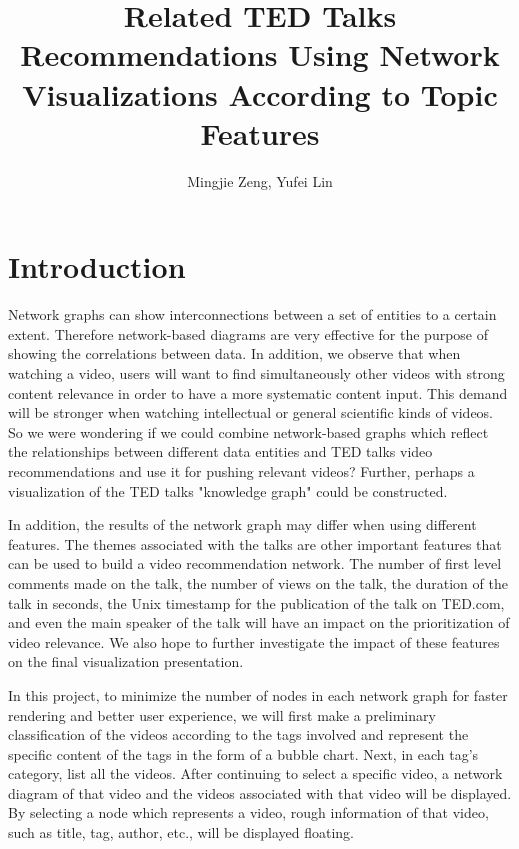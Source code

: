 \documentclass{proc}
\begin{document}
\title{Related TED Talks Recommendations Using Network Visualizations According to Topic Features }

\author{Mingjie Zeng, Yufei Lin}

\maketitle

\section{Introduction}

Network graphs can show interconnections between a set of entities to a certain extent. Therefore network-based diagrams are very effective for the purpose of showing the correlations between data. In addition, we observe that when watching a video, users will want to find simultaneously other videos with strong content relevance in order to have a more systematic content input. This demand will be stronger when watching intellectual or general scientific kinds of videos. So we were wondering if we could combine network-based graphs which reflect the relationships between different data entities and TED talks video recommendations and use it for pushing relevant videos? Further, perhaps a visualization of the TED talks "knowledge graph" could be constructed. 

In addition, the results of the network graph may differ when using different features. The themes associated with the talks are other important features that can be used to build a video recommendation network. The number of first level comments made on the talk, the number of views on the talk, the duration of the talk in seconds, the Unix timestamp for the publication of the talk on TED.com, and even the main speaker of the talk will have an impact on the prioritization of video relevance. We also hope to further investigate the impact of these features on the final visualization presentation.

In this project, to minimize the number of nodes in each network graph for faster rendering and better user experience, we will first make a preliminary classification of the videos according to the tags involved and represent the specific content of the tags in the form of a bubble chart. Next, in each tag's category, list all the videos. After continuing to select a specific video, a network diagram of that video and the videos associated with that video will be displayed. By selecting a node which represents a video, rough information of that video, such as title, tag, author, etc., will be displayed floating.
\end{document}
